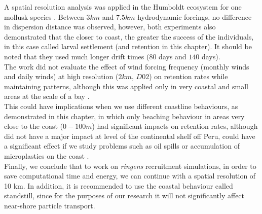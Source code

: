 A spatial resolution analysis was applied in the Humboldt ecosystem for one mollusk species \citep{GaraKapl2014}. Between $3 km$ and $7.5 km$ hydrodynamic forcings, no difference in dispersion distance was observed, however, both experiments also demonstrated that the closer to coast, the greater the success of the individuals, in this case called larval settlement (and retention in this chapter). It should be noted that they used much longer drift times ($80$ days and $140$ days).\\

The work did not evaluate the effect of wind forcing frequency (monthly winds and daily winds) at high resolution ($2 km$, $D02$) on retention rates while maintaining patterns, although this was applied only in very coastal and small areas at the scale of a bay \citep{FlorTam2019}.\\

This could have implications when we use different coastline behaviours, as demonstrated in this chapter, in which only beaching behaviour in areas very close to the coast ($0 - 100 m$) had significant impacts on retention rates, although did not have a major impact at level of the continental shelf off Peru, could have a significant effect if we study problems such as oil spills or accumulation of microplastics on the coast \citep{AtwoFalc2019,LopeNajj2021}.\\

Finally, we conclude that to work on \textit{\gls{ringens}} recruitment simulations, in order to save computational time and energy, we can continue with a spatial resolution of 10 km. In addition, it is recommended to use the coastal behaviour called standstill, since for the purposes of our research it will not significantly affect near-shore particle transport.\\
